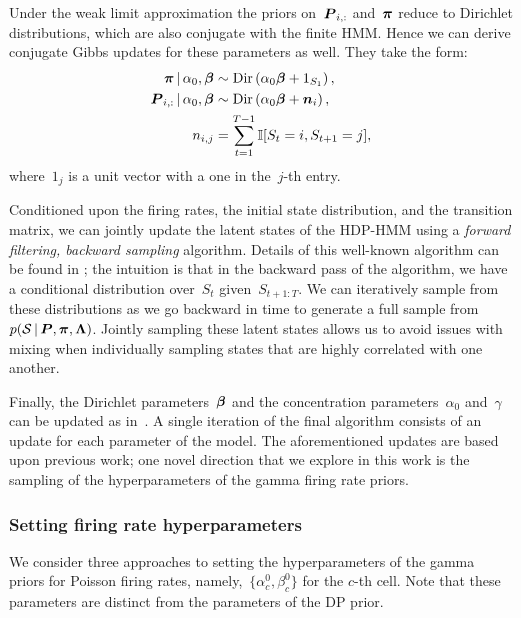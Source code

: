 Under the weak limit approximation the priors on~$\boldsymbol{P}_{i,:}$ and~$\boldsymbol{\pi}$ reduce to Dirichlet distributions, which are also conjugate with the finite HMM. Hence we can derive conjugate Gibbs updates for these parameters as well. They take the form:
\begin{align}
\boldsymbol{\pi} \,|\, \alpha_0, \boldsymbol{\beta} &\sim \mathrm{Dir}\left(\alpha_0\boldsymbol{\beta} + 1_{S_1}\right),\\
\nonumber \boldsymbol{P}_{i,:} \,|\, \alpha_0, \boldsymbol{\beta} &\sim \mathrm{Dir}\left(\alpha_0\boldsymbol{\beta} + \boldsymbol{n}_{i}\right),\\
\nonumber n_{i,j}&=\sum_{t=1}^{T-1} \mathbb{I}[S_t=i,S_{t+1}=j],
\end{align}
where~$1_j$ is a unit vector with a one in the~$j$-th entry.

Conditioned upon the firing rates, the initial state distribution, and the transition matrix, we can jointly update the latent states of the HDP-HMM using a {\em  forward filtering, backward sampling} algorithm. Details of this well-known algorithm can be found in \citep{Johnson14b}; the intuition is that in the backward pass of the algorithm, we have a conditional distribution over~$S_t$ given~$S_{t+1:T}$. We can iteratively sample from these distributions as we go backward in time to generate a full sample from~${p(\mathcal{S} \,|\, \boldsymbol{P}, \boldsymbol{\pi}, \boldsymbol{\Lambda})}$. Jointly sampling these latent states allows us to avoid issues with mixing when individually sampling states that are highly correlated with one another.

Finally, the Dirichlet parameters~$\boldsymbol{\beta}$ and the concentration parameters~$\alpha_0$ and~$\gamma$ can be updated as in~\citep{Teh06}. A single iteration of the final algorithm consists of an update for each parameter of the model. The aforementioned updates are based upon previous work; one novel direction that we explore in this work is the sampling of the hyperparameters of the gamma firing rate priors.

\subsubsection{Setting firing rate hyperparameters} 
\label{sec:fr_hypers}
We consider three approaches to setting the hyperparameters of the gamma priors for Poisson firing rates, namely,~${\{\alpha_c^0, \beta_c^0\}}$ for the $c$-th cell.  Note that these parameters are distinct from the parameters of the DP prior. 


